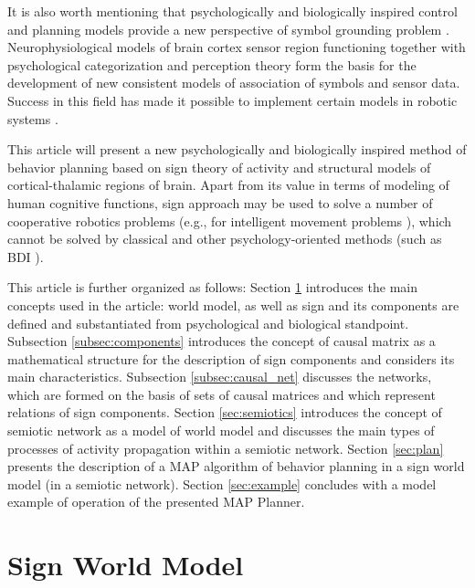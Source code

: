 \documentclass[review]{elsarticle}
\begin{document}
It is also worth mentioning that psychologically and biologically inspired control and planning models provide a new perspective of symbol grounding problem \cite{Harnad1990,Barsalou1999,Chella2003,Besold2015}. Neurophysiological models of brain cortex sensor region functioning together with psychological categorization and perception theory form the basis for the development of new consistent models of association of symbols and sensor data. Success in this field has made it possible to implement certain models in robotic systems \cite{Heintz2010}. 

This article will present a new psychologically and biologically inspired method of behavior planning based on sign theory of activity and structural models of cortical-thalamic regions of brain. Apart from its value in terms of modeling of human cognitive functions, sign approach may be used to solve a number of cooperative robotics problems (e.g., for intelligent movement problems \cite{Panov2016b,Panov2016c}), which cannot be solved by classical and other psychology-oriented methods (such as BDI \cite{Sardina2006}).

This article is further organized as follows: Section \ref{sec:swm} introduces the main concepts used in the article: world model, as well as sign and its components are defined and substantiated from psychological and biological standpoint. Subsection \ref{subsec:components} introduces the concept of causal matrix as a mathematical structure for the description of sign components and considers its main characteristics. Subsection \ref{subsec:causal_net} discusses the networks, which are formed on the basis of sets of causal matrices and which represent relations of sign components. Section \ref{sec:semiotics} introduces the concept of semiotic network as a model of world model and discusses the main types of processes of activity propagation within a semiotic network. Section \ref{sec:plan} presents the description of a MAP algorithm of behavior planning in a sign world model (in a semiotic network). Section \ref{sec:example} concludes with a model example of operation of the presented MAP Planner.


\section{Sign World Model}\label{sec:swm}
\end{document}
